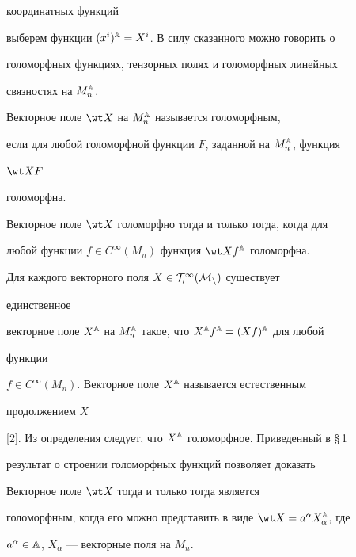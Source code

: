 координатных функций 


выберем функции $(x^i)^{\Bbb A}=X^i$. В силу сказанного можно говорить о 


голоморфных функциях, тензорных полях и голоморфных линейных 


связностях на $M^{\Bbb A}_n$. 


 


\begin{defns} Векторное поле $\wt X$ на $M^{\Bbb A}_n$ называется голоморфным,  


если для любой голоморфной функции $F$, заданной на $M^{\Bbb A}_n$, функция 


$\wt XF$ 


голоморфна. 


\end{defns} 


 


Векторное поле $\wt X$ голоморфно тогда и только тогда, когда для 


любой функции $f\in C^\infty(M_n)$ функция $\wt X f\A$ голоморфна. 


 


Для каждого векторного поля $X\in\cal T^1_0(M_n)$ существует 


единственное  


векторное поле $X^{\Bbb A}$ на $M^{\Bbb A}_n$ такое, что $X^{\Bbb A} f^{\Bbb A}=(X f)^{\Bbb A}$ для любой 


функции  


$f\in C^\infty(M_n)$. Векторное поле $X^{\Bbb A}$ называется естественным 


продолжением $X$ 


[2]. Из определения следует, что $X^{\Bbb A}$ голоморфное. Приведенный в \S\,1  


результат о строении голоморфных функций позволяет доказать 


 


\begin{props} Векторное поле $\wt X$ тогда и только тогда является 


голоморфным, когда его можно представить в виде $\wt X=a^\alpha 


X\A_\alpha$, где 


$a^\alpha\in\Bbb A$, $X_\alpha$ --- векторные поля на $M_n$. 


\end{props} 


